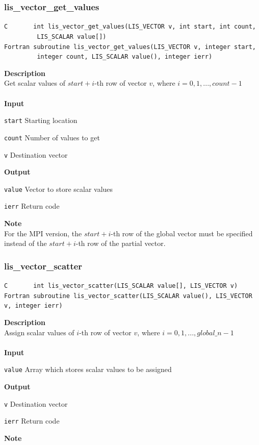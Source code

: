 \documentclass[a4paper]{article}
\newcommand{\namelistlabel}[1]{\mbox{#1}\hfill}
\newenvironment{namelist}[1]{%
 \begin{list}{}
  {\let\makelabel\namelistlabel
  \settowidth{\labelwidth}{#1}
  \setlength{\leftmargin}{1.1\labelwidth}}
}{%
\end{list}}
\begin{document}
  \subsubsection{lis\_vector\_get\_values}
\begin{screen}
\verb|C       int lis_vector_get_values(LIS_VECTOR v, int start, int count,|\\
\verb|         LIS_SCALAR value[])|\\
\verb|Fortran subroutine lis_vector_get_values(LIS_VECTOR v, integer start,|\\
\verb|         integer count, LIS_SCALAR value(), integer ierr)|
\end{screen}
{\bf Description}\\
\indent
Get scalar values of $start+i$-th row of vector $v$, 
where $i=0,1,...,count-1$
\\ \\
\noindent
{\bf Input}
\begin{namelist}{XXXXXXXXXXXXXXXXXXXX}
\item[\tt start] Starting location 
\item[\tt count] Number of values to get
\item[\tt v] Destination vector
\end{namelist}
{\bf Output}
\begin{namelist}{XXXXXXXXXXXXXXXXXXXX}
\item[\tt value] Vector to store scalar values
\item[\tt ierr] Return code
\end{namelist}
{\bf Note}\\
\indent
For the MPI version, the $start+i$-th row of the global vector
must be specified instead of 
the $start+i$-th row of the partial vector.
\newpage
  \subsubsection{lis\_vector\_scatter}
\begin{screen}
\verb|C       int lis_vector_scatter(LIS_SCALAR value[], LIS_VECTOR v)|\\
\verb|Fortran subroutine lis_vector_scatter(LIS_SCALAR value(), LIS_VECTOR v, integer ierr)|
\end{screen}
{\bf Description}\\
\indent
Assign scalar values of $i$-th row of vector $v$, 
where $i=0,1,..., global\_n-1$
\\ \\
\noindent
{\bf Input}
\begin{namelist}{XXXXXXXXXXXXXXXXXXXX}
\item[\tt value] Array which stores scalar values to be assigned
\end{namelist}
{\bf Output}
\begin{namelist}{XXXXXXXXXXXXXXXXXXXX}
\item[\tt v] Destination vector
\item[\tt ierr] Return code
\end{namelist}
{\bf Note}\\
\indent
\end{document}
